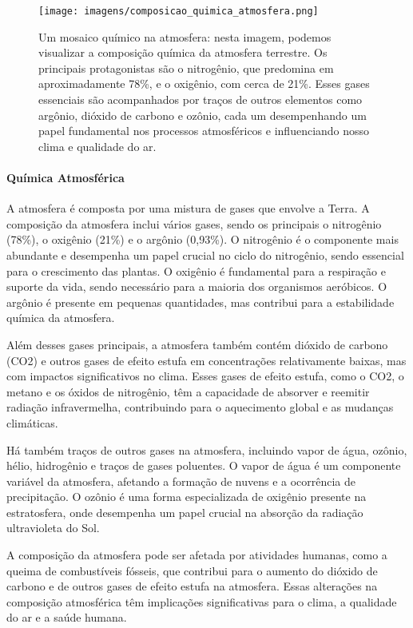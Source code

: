 \documentclass[a4paper, 12pt, onecolumn,singlespacing]{article}
\begin{document}
	\begin{figure}[h]
		\centering
		\texttt{[image: imagens/composicao\_quimica\_atmosfera.png]}
		\caption{Um mosaico químico na atmosfera: nesta imagem, podemos visualizar a composição química da atmosfera terrestre. Os principais protagonistas são o nitrogênio, que predomina em aproximadamente 78\%, e o oxigênio, com cerca de 21\%. Esses gases essenciais são acompanhados por traços de outros elementos como argônio, dióxido de carbono e ozônio, cada um desempenhando um papel fundamental nos processos atmosféricos e influenciando nosso clima e qualidade do ar.}
		\label{fig:quimica_atmosfera}
	\end{figure}
	
	\paragraph{Química Atmosférica} A atmosfera é composta por uma mistura de gases que envolve a Terra. A composição da atmosfera inclui vários gases, sendo os principais o nitrogênio (78\%), o oxigênio (21\%) e o argônio (0,93\%). O nitrogênio é o componente mais abundante e desempenha um papel crucial no ciclo do nitrogênio, sendo essencial para o crescimento das plantas. O oxigênio é fundamental para a respiração e suporte da vida, sendo necessário para a maioria dos organismos aeróbicos. O argônio é presente em pequenas quantidades, mas contribui para a estabilidade química da atmosfera.
	
	Além desses gases principais, a atmosfera também contém dióxido de carbono (CO2) e outros gases de efeito estufa em concentrações relativamente baixas, mas com impactos significativos no clima. Esses gases de efeito estufa, como o CO2, o metano e os óxidos de nitrogênio, têm a capacidade de absorver e reemitir radiação infravermelha, contribuindo para o aquecimento global e as mudanças climáticas.
	
	Há também traços de outros gases na atmosfera, incluindo vapor de água, ozônio, hélio, hidrogênio e traços de gases poluentes. O vapor de água é um componente variável da atmosfera, afetando a formação de nuvens e a ocorrência de precipitação. O ozônio é uma forma especializada de oxigênio presente na estratosfera, onde desempenha um papel crucial na absorção da radiação ultravioleta do Sol.
	
	A composição da atmosfera pode ser afetada por atividades humanas, como a queima de combustíveis fósseis, que contribui para o aumento do dióxido de carbono e de outros gases de efeito estufa na atmosfera. Essas alterações na composição atmosférica têm implicações significativas para o clima, a qualidade do ar e a saúde humana.
	
\end{document}
